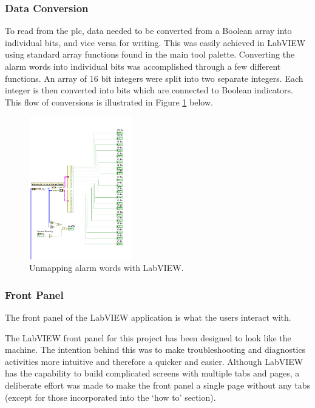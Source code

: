             
        \subsubsection{Data Conversion}
            To read from the \acrshort{plc}, data needed to be converted from a Boolean array into individual bits, and vice versa for writing. This was easily achieved in LabVIEW using standard array functions found in the main tool palette. Converting the alarm words into individual bits was accomplished through a few different functions. An array of 16 bit integers were split into two separate integers. Each integer is then converted into bits which are connected to Boolean indicators. This flow of conversions is illustrated in Figure \ref{fig:labViewAlarmUnmap} below.

        \begin{figure}[H]
                \centering
                \includegraphics[width = 0.4\textwidth]{2_images/labViewAlarmUnmap}
                \caption{Unmapping alarm words with LabVIEW.}
                \label{fig:labViewAlarmUnmap}
        \end{figure}   
            
        \subsubsection{Front Panel}

            The front panel of the LabVIEW application is what the users interact with.
            
            The LabVIEW front panel for this project has been designed to look like the machine. The intention behind this was to make troubleshooting and diagnostics activities more intuitive and therefore a quicker and easier. Although LabVIEW has the capability to build complicated screens with multiple tabs and pages, a deliberate effort was made to make the front panel a single page without any tabs (except for those incorporated into the `how to' section).
            
